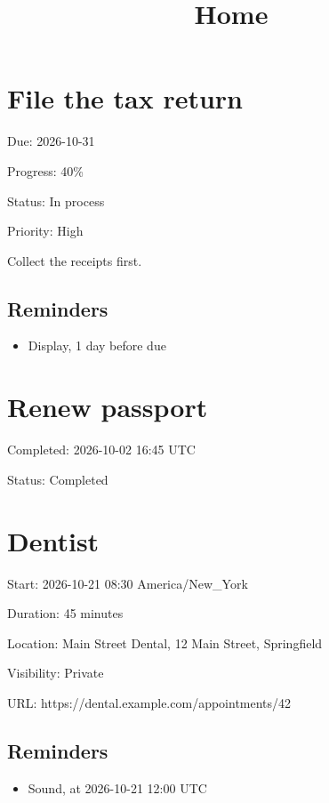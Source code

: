 \documentclass[11pt,a4paper]{article}
\title{Home}
\begin{document}
\maketitle

\section{File the tax return}

Due: 2026-10-31

Progress: 40\%

Status: In process

Priority: High

Collect the receipts first.

\subsection{Reminders}

\begin{itemize}
\item Display, 1 day before due
\end{itemize}

\section{Renew passport}

Completed: 2026-10-02 16:45 UTC

Status: Completed

\section{Dentist}

Start: 2026-10-21 08:30 America/New\_York

Duration: 45 minutes

Location: Main Street Dental, 12 Main Street, Springfield

Visibility: Private

URL: https://dental.example.com/appointments/42

\subsection{Reminders}

\begin{itemize}
\item Sound, at 2026-10-21 12:00 UTC
\end{itemize}
\end{document}
